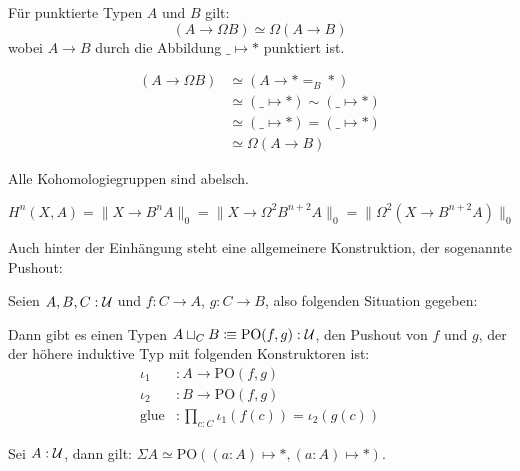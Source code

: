 \begin{lemma}
  Für punktierte Typen $A$ und $B$ gilt:
  \[
    (A\to \Omega B)\simeq \Omega (A \to B)
  \]
  wobei $A\to B$ durch die Abbildung $\_\mapsto \ast$ punktiert ist.
\end{lemma}
\begin{beweis}
  \begin{align*}
    (A\to \Omega B) &\simeq (A\to \ast=_B \ast)\\
                    &\simeq (\_\mapsto \ast)\sim (\_\mapsto \ast) \\
                    &\simeq (\_\mapsto \ast) = (\_\mapsto \ast)\\
                    &\simeq \Omega (A\to B)
  \end{align*}
\end{beweis}


\begin{bemerkung}
  Alle Kohomologiegruppen sind abelsch.
\end{bemerkung}
\begin{beweis}
  $H^n(X,A)=\|X\to B^nA\|_0=\|X\to \Omega^2 B^{n+2}A\|_0=\|\Omega^2 (X\to  B^{n+2}A)\|_0$
\end{beweis}

Auch hinter der Einhängung steht eine allgemeinere Konstruktion, der sogenannte Pushout:

\begin{regeln}[Pushout]
  Seien $A,B,C:\mathcal{U}$ und $f:C\to A$, $g:C\to B$, also folgenden Situation gegeben:
  \begin{center}
  \end{center}
  Dann gibt es einen Typen $A\sqcup_C B\vcentcolon\mspace{-1.2mu}\equiv \mathrm{PO}(f,g):\mathcal{U}$, den Pushout von $f$ und $g$, der der höhere induktive Typ mit folgenden Konstruktoren ist:
  \begin{align*}
    \iota_1&:A\to \mathrm{PO}(f,g) \\
    \iota_2&:B\to \mathrm{PO}(f,g) \\
    \mathrm{glue}&:\prod_{c:C}\iota_1(f(c))=\iota_2(g(c))
  \end{align*}
\end{regeln}

\begin{bemerkung}
  Sei $A:\mathcal{U}$, dann gilt: $\Sigma A\simeq \mathrm{PO}((a:A)\mapsto \ast, (a:A)\mapsto \ast)$.
\end{bemerkung}

